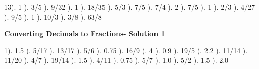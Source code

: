 \documentclass{article}%
\begin{document}
13). 1%
). 3/5%
). 9/32%
). 1%
). 18/35%
). 5/3%
). 7/5%
). 7/4%
). 2%
). 7/5%
). 1%
). 2/3%
). 4/27%
). 9/5%
). 1%
). 10/3%
). 3/8%
). 63/8%
\newline%
\newpage%
\large%
\begin{center}%
\textbf{Converting Decimals to Fractions- Solution 1}%
\newline%
\end{center} \normalsize%
1). 1.5%
). 5/17%
). 13/17%
). 5/6%
). 0.75%
). 16/9%
). 4%
). 0.9%
). 19/5%
). 2.2%
). 11/14%
). 11/20%
). 4/7%
). 19/14%
). 1.5%
). 4/11%
). 0.75%
). 5/7%
). 1.0%
). 5/2%
). 1.5%
). 2.0%
\newline%
\end{document}
